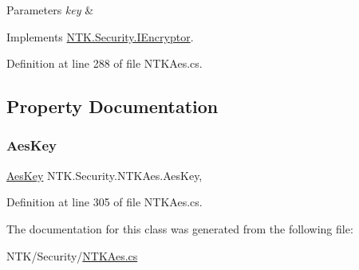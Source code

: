 \begin{DoxyParams}{Parameters}
{\em key} & \\
\hline
\end{DoxyParams}


Implements \mbox{\hyperlink{interface_n_t_k_1_1_security_1_1_i_encryptor_af4535102ef70526422662857b557971e}{N\+T\+K.\+Security.\+I\+Encryptor}}.



Definition at line 288 of file N\+T\+K\+Aes.\+cs.



\subsection{Property Documentation}
\mbox{\label{class_n_t_k_1_1_security_1_1_n_t_k_aes_a7e45b5269a21d530fdc1447631d9dd3e}} 
\subsubsection{\texorpdfstring{AesKey}{AesKey}}
{\footnotesize\ttfamily \mbox{\hyperlink{struct_n_t_k_1_1_security_1_1_aes_key}{Aes\+Key}} N\+T\+K.\+Security.\+N\+T\+K\+Aes.\+Aes\+Key\hspace{0.3cm}{\ttfamily [get]}, {\ttfamily [set]}}







Definition at line 305 of file N\+T\+K\+Aes.\+cs.



The documentation for this class was generated from the following file\+:\begin{DoxyCompactItemize}
\item 
N\+T\+K/\+Security/\mbox{\hyperlink{_n_t_k_aes_8cs}{N\+T\+K\+Aes.\+cs}}\end{DoxyCompactItemize}
